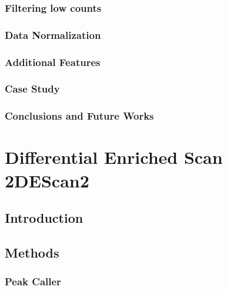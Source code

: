 \documentclass[b5paper,oneside,british,intoc,bibliograph=totoc,index=totoc,BCOR10mm,twoside,openright]{book}
\numberwithin{equation}{section}
\numberwithin{figure}{section}
\begin{document}
\subsection{Filtering low counts} \label{sec:ticorserfiltering}


\subsection{Data Normalization} \label{sec:ticorsernormalization}


\subsection{Additional Features} \label{sec:ticorseraddfeat}




\subsection{Case Study} \label{sec:ticorseresults}


\subsection{Conclusions and Future Works} \label{sec:ticorseconclusions}


\chapter{Differential Enriched Scan 2\newline DEScan2} \label{sec:descan2cap}


\section{Introduction} \label{sec:descan2intro}


\section{Methods} \label{sec:descan2methods}


\subsection{Peak Caller} \label{sec:descan2peakcall}

\end{document}
